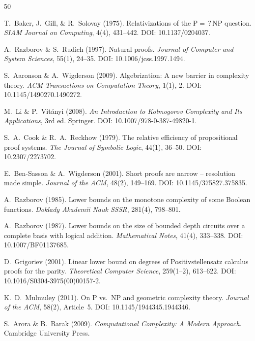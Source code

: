 \documentclass[aps,prd,twocolumn,superscriptaddress,nofootinbib]{revtex4-2}
\theoremstyle{definition}
\theoremstyle{remark}
\begin{document}
\begin{thebibliography}{50}

T.~Baker, J.~Gill, \& R.~Solovay (1975).
Relativizations of the $\mathrm{P} =\mathrel{?} \mathrm{NP}$ question.
\textit{SIAM Journal on Computing}, 4(4), 431--442.
DOI: 10.1137/0204037.

A.~Razborov \& S.~Rudich (1997).
Natural proofs.
\textit{Journal of Computer and System Sciences}, 55(1), 24--35.
DOI: 10.1006/jcss.1997.1494.

S.~Aaronson \& A.~Wigderson (2009).
Algebrization: A new barrier in complexity theory.
\textit{ACM Transactions on Computation Theory}, 1(1), 2.
DOI: 10.1145/1490270.1490272.

M.~Li \& P.~Vit\'anyi (2008).
\textit{An Introduction to Kolmogorov Complexity and Its Applications}, 3rd ed.
Springer.
DOI: 10.1007/978-0-387-49820-1.

S.~A.~Cook \& R.~A.~Reckhow (1979).
The relative efficiency of propositional proof systems.
\textit{The Journal of Symbolic Logic}, 44(1), 36--50.
DOI: 10.2307/2273702.

E.~Ben-Sasson \& A.~Wigderson (2001).
Short proofs are narrow -- resolution made simple.
\textit{Journal of the ACM}, 48(2), 149--169.
DOI: 10.1145/375827.375835.

A.~Razborov (1985).
Lower bounds on the monotone complexity of some Boolean functions.
\textit{Doklady Akademii Nauk SSSR}, 281(4), 798--801.

A.~Razborov (1987).
Lower bounds on the size of bounded depth circuits over a complete basis with logical addition.
\textit{Mathematical Notes}, 41(4), 333--338.
DOI: 10.1007/BF01137685.

D.~Grigoriev (2001).
Linear lower bound on degrees of Positivstellensatz calculus proofs for the parity.
\textit{Theoretical Computer Science}, 259(1--2), 613--622.
DOI: 10.1016/S0304-3975(00)00157-2.

K.~D.~Mulmuley (2011).
On P vs.\ NP and geometric complexity theory.
\textit{Journal of the ACM}, 58(2), Article~5.
DOI: 10.1145/1944345.1944346.

S.~Arora \& B.~Barak (2009).
\textit{Computational Complexity: A Modern Approach}.
Cambridge University Press.


\end{thebibliography}
\end{document}
